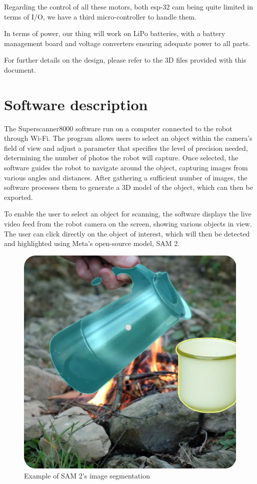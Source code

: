 \documentclass{article}
\begin{document}
Regarding the control of all these motors, both esp-32 cam being quite limited in terms of I/O, we have a third micro-controller to handle them.

In terms of power, our thing will work on LiPo batteries, with a battery management board and voltage converters ensuring adequate power to all parts.

For further details on the design, please refer to the 3D files provided with this document.

\section{Software description}

The Superscanner8000 software run on a computer connected to the robot through Wi-Fi. The program allows users to select an object within the camera’s field of view and adjust a parameter that specifies the level of precision needed, determining the number of photos the robot will capture. Once selected, the software guides the robot to navigate around the object, capturing images from various angles and distances. After gathering a sufficient number of images, the software processes them to generate a 3D model of the object, which can then be exported.

To enable the user to select an object for scanning, the software displays the live video feed from the robot camera on the screen, showing various objects in view. The user can click directly on the object of interest, which will then be detected and highlighted using Meta's open-source model, SAM 2.

\begin{figure}[H]
    \centering
    \includegraphics[width=0.5\linewidth]{images/sam2-example.png}
    \caption{Example of SAM 2's image segmentation}
    \label{fig:sam2-example}
\end{figure}
\end{document}
